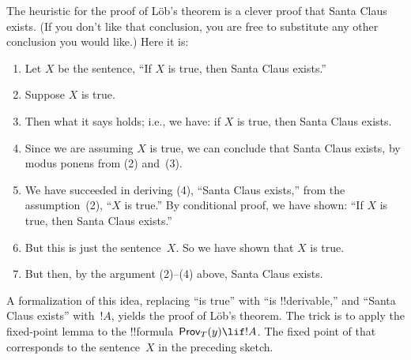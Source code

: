 \documentclass[../../../include/open-logic-section]{subfiles}
\begin{document}
\begin{explain}
The heuristic for the proof of L\"ob's theorem is a clever proof that
Santa Claus exists. (If you don't like that conclusion, you are free
to substitute any other conclusion you would like.) Here it is:
\begin{enumerate}
\item Let $X$ be the sentence, ``If $X$ is true, then Santa Claus
  exists.''
\item Suppose $X$ is true.
\item Then what it says holds; i.e., we have: if $X$ is true, then
  Santa Claus exists.
\item Since we are assuming $X$ is true, we can conclude that
  Santa Claus exists, by modus ponens from (2) and~(3).
\item We have succeeded in deriving (4), ``Santa Claus exists,'' from
  the assumption~(2), ``$X$ is true.'' By conditional proof, we have
  shown: ``If $X$ is true, then Santa Claus exists.''
\item But this is just the sentence~$X$. So we have shown that $X$ is
  true.
\item But then, by the argument (2)--(4) above, Santa Claus exists.
\end{enumerate}
A formalization of this idea, replacing ``is true'' with ``is
!!{derivable},'' and ``Santa Claus exists'' with~$!A$, yields the proof of
L\"ob's theorem. The trick is to apply the fixed-point lemma to the
!!{formula}~$\OProv[T](y) \lif !A$. The fixed point of that
corresponds to the sentence~$X$ in the preceding sketch.
\end{explain}
\end{document}
